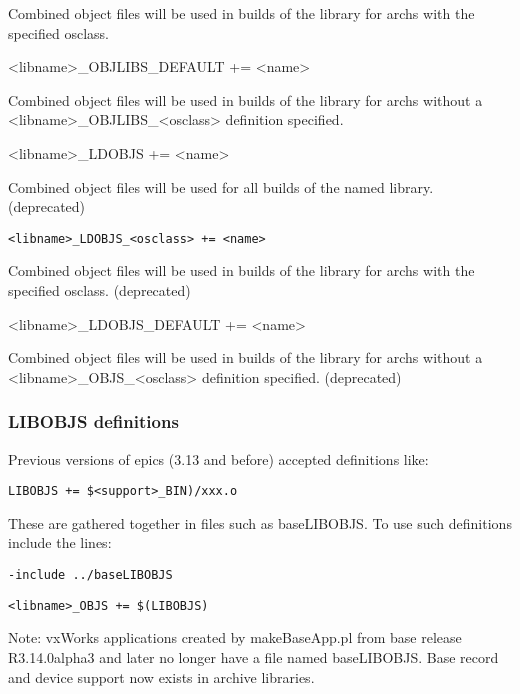 \begin{description}
Combined object files will be used in builds of the library for archs with the specified osclass.

\item \textless{}libname\textgreater{}\_OBJLIBS\_DEFAULT += \textless{}name\textgreater{}

Combined object files will be used in builds of the library for archs without a 
\textless{}libname\textgreater{}\_OBJLIBS\_\textless{}osclass\textgreater{} definition specified.

\item

\item \textless{}libname\textgreater{}\_LDOBJS += \textless{}name\textgreater{}

Combined object files will be used for all builds of the named library. (deprecated)

\item \verb|<libname>_LDOBJS_<osclass> += <name>| 

Combined object files will be used in builds of the library for archs with the specified osclass. (deprecated)

\item \textless{}libname\textgreater{}\_LDOBJS\_DEFAULT += \textless{}name\textgreater{}

Combined object files will be used in builds of the library for archs without a \textless{}libname\textgreater{}\_OBJS\_\textless{}osclass\textgreater{} 
definition specified. (deprecated)

\end{description}

\subsubsection{ LIBOBJS definitions}

Previous versions of epics (3.13 and before) accepted definitions like:

\begin{description}

\item \verb|LIBOBJS += $<support>_BIN)/xxx.o|

These are gathered together in files such as baseLIBOBJS. To use such definitions include the lines:

\item \verb|-include ../baseLIBOBJS|

\item \verb|<libname>_OBJS += $(LIBOBJS)|

Note: vxWorks applications created by makeBaseApp.pl from base release R3.14.0alpha3 and later no longer have a file 
named baseLIBOBJS. Base record and device support now exists in archive libraries.

\end{description}

